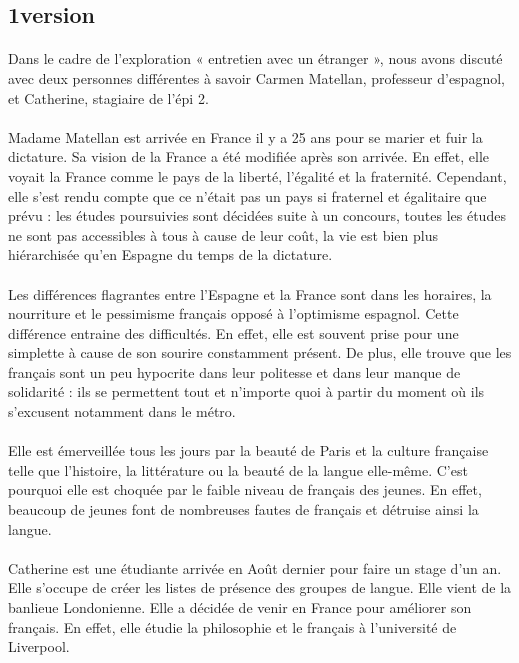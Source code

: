 \subsection{1\ier version}
\paragraph{}
Dans le cadre de l’exploration « entretien avec un étranger », nous avons discuté avec deux personnes différentes à savoir Carmen Matellan, professeur d’espagnol, et Catherine, stagiaire de l’épi 2.
\paragraph{}
Madame Matellan est arrivée en France il y a 25 ans pour se marier et fuir la dictature. Sa vision de la France a été modifiée après son arrivée. En effet, elle voyait la France comme le pays de la liberté, l’égalité et la fraternité. Cependant, elle s’est rendu compte que ce n’était pas un pays si fraternel et égalitaire que prévu : les études poursuivies sont décidées suite à un concours, toutes les études ne sont pas accessibles à tous à cause de leur coût, la vie est bien plus hiérarchisée qu’en Espagne du temps de la dictature. 
\paragraph{}
Les différences flagrantes entre l’Espagne et la France sont dans les horaires, la nourriture et le pessimisme français opposé à l’optimisme espagnol. Cette différence entraine des difficultés. En effet, elle est souvent prise pour une simplette à cause de son sourire constamment présent. De plus, elle trouve que les français sont un peu hypocrite dans leur politesse et dans leur manque de solidarité : ils se permettent tout et n’importe quoi à partir du moment où ils s’excusent notamment dans le métro.
\paragraph{}
Elle est émerveillée tous les jours par la beauté de Paris et la culture française telle que l’histoire, la littérature ou la beauté de la langue elle-même. C’est pourquoi elle est choquée par le faible niveau de français des jeunes. En effet, beaucoup de jeunes font de nombreuses fautes de français et détruise ainsi la langue.
\paragraph{}
Catherine est une étudiante arrivée en Août dernier pour faire un stage d’un an. Elle s’occupe de créer les listes de présence des groupes de langue. Elle vient de la banlieue Londonienne. Elle a décidée de venir en France pour améliorer son français. En effet, elle étudie la philosophie et le français à l’université de Liverpool.
